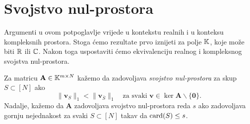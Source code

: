 \documentclass[a4paper,twoside,12pt]{memoir} %
\newcommand{\vect}[1]{\mathbf{#1}}
\renewcommand{\vec}{\vect}
\newcommand{\card}{\text{\normalfont{card}}}
\newcommand{\norm}[1]{\|{#1}\|}
\begin{document}
\section[Svojstvo nul-prostora][Svojstvo nul-prostora]{Svojstvo nul-prostora}
Argumenti u ovom potpoglavlje vrijede u kontekstu realnih i u konteksu kompleksnih prostora. Stoga \'cemo rezultate prvo iznijeti za polje $\mathbb{K}$, koje mo\v{z}e biti $\mathbb{R}$ ili $\mathbb{C}$. Nakon toga uspostaviti \'cemo ekvivalenciju realnog i kompleksnog svojstva nul-prostora.

\begin{defn}
    Za matricu $\vec A \in \K^{m \times N}$ ka\v{z}emo da zadovoljava \textit{svojstvo nul-prostora} za skup $S \subset [N]$ ako
    \begin{equation}\label{svojstvo_nul_prostora}
        \norm{\vec v_S}_1 < \norm{\vec v_{\bar{S}}}_1  \quad \text{za svaki }\vec v \in \ker \vec A \backslash \{\vec 0\}.
    \end{equation}
    Nadalje, ka\v{z}emo da $\vec A$ zadovoljava svojstvo nul-prostora reda $s$ ako zadovoljava gornju nejednakost za svaki $S \subset [N]$ takav da $\card(S) \leq s$.
\end{defn}
\end{document}

